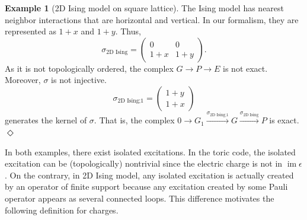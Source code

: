 \documentclass[letterpaper,12pt]{amsart}
\theoremstyle{definition} \newtheorem{defn}{Definition}
\theoremstyle{definition} \newtheorem{rem}{Remark}
\theoremstyle{definition} \newtheorem{example}{Example}
\newcommand{\im}{\mathop{\mathrm{im}}}
\begin{document}
\begin{example}[2D Ising model on square lattice]
The Ising model has nearest neighbor interactions that are horizontal and vertical.
In our formalism, they are represented as $1+x$ and $1+y$. Thus,
\[
 \sigma_\text{2D Ising} =
\begin{pmatrix}
 0   & 0 \\
 1+x & 1+y
\end{pmatrix} .
\]
As it is not topologically ordered, the complex $G \to P \to E$ is not exact.
Moreover, $\sigma$ is not injective.
\[
 \sigma_\text{2D Ising;1} =
\begin{pmatrix}
 1+y \\
 1+x
\end{pmatrix}
\]
generates the kernel of $\sigma$. That is, the complex 
$0 \to G_1 \xrightarrow{ \sigma_\text{2D Ising;1}} G \xrightarrow{ \sigma_\text{2D Ising} } P$ is exact.
\hfill $\Diamond$
\end{example}

In both examples, there exist isolated excitations.
In the toric code, the isolated excitation can be
(topologically) nontrivial since the electric charge is not in $\im \epsilon$.
On the contrary, in 2D Ising model, any isolated excitation is 
actually created by an operator of finite support
because any excitation created by some Pauli operator appears as several connected loops.
This difference motivates the following definition for charges.
\end{document}
